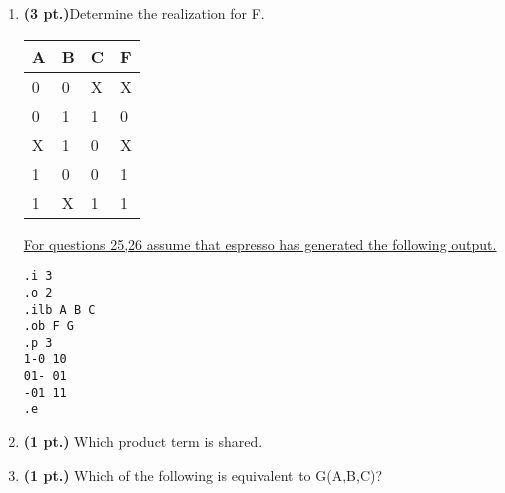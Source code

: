 \documentclass{article}
\begin{document}
\begin{enumerate}
\pagebreak
\item {\bf (3 pt.)}Determine the \SOPmin realization for F.


\begin{tabular}{l|l|l||l}
A & B & C & F \\ \hline \hline
0 & 0 & X & X \\ \hline
0 & 1 & 1 & 0 \\ \hline
X & 1 & 0 & X \\ \hline
1 & 0 & 0 & 1 \\ \hline
1 & X & 1 & 1 \\
\end{tabular}


\underline{For questions 25,26 assume that espresso has generated the following output.}
\begin{verbatim}
.i 3
.o 2
.ilb A B C
.ob F G
.p 3
1-0 10
01- 01
-01 11
.e
\end{verbatim}

\item{\bf (1 pt.)}  Which product term is shared.

\item{\bf (1 pt.)}  Which of the following is equivalent to G(A,B,C)?

\end{enumerate}
\end{document}
